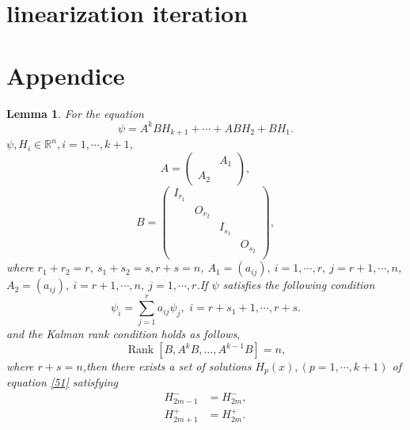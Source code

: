 \documentclass[a4paper,reqno,11pt]{amsart}
\numberwithin{equation}{section} %
\newtheorem{lem}{Lemma}[section]
\begin{document}
\section{linearization iteration}























\section{Appendice}
\begin{lem}\label{l50}
	For the equation
	\begin{equation}\label{51}
		\psi =A^kBH_{k+1} +\cdots +ABH_2 +BH_1.
	\end{equation}
	$\psi , H_i \in \mathbb{R} ^n ,i = 1,\cdots,k+1$,
	$$
	A=\left(\begin{array}{ll} 
		& A_1 \\
		A_2 &
	\end{array}\right),
	$$
	$$
	B=\left( \begin{matrix}
		I_{r_1}&		&		&		\\
		&		O_{r_2}&		&		\\
		&		&		I_{s_1}&		\\
		&		&		&		O_{s_2}\\
	\end{matrix} \right) ,
	$$
	where $r_1 +r_2 =r,\ s_1+s_2=s, r+s=n $, $A_1=\left( a_{ij} \right) ,\ i=1,\cdots ,r,\ j=r+1,\cdots ,n$, $A_2=\left( a_{ij} \right) ,\ i=r+1,\cdots ,n,\ j=1,\cdots ,r$.If $\psi$ satisfies the following condition
	\begin{equation}\label{52}
		\psi _i=\sum_{j=1}^r{a_{ij}\psi _j ,\,\,i=r+s_1+1,\cdots ,r+s.}
	\end{equation}
	and the Kalman rank condition holds as follows,
	\begin{equation}\label{53}
		\operatorname{Rank}\left[B, A^k B, \ldots, A^{k-1} B\right]=n,
	\end{equation}
	where $r+s=n$,then there exists a set of solutions $H_p (x), (p = 1, \cdots , k+1)$ of equation \eqref{51} satisfying
	\begin{align}
		H^{-}_{2m-1} &= H^{-}_{2m}\label{55} ,\\
		H^{+}_{2m+1} &= H^{+}_{2m}\label{56} .
	\end{align}
\end{lem}
\end{document}
